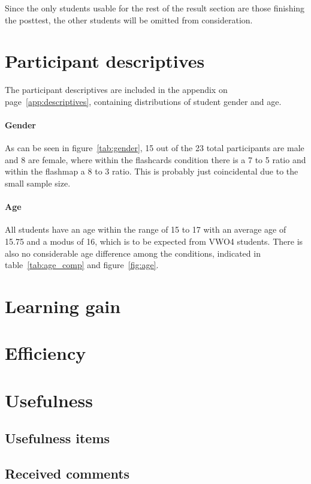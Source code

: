 Since the only students usable for the rest of the result section are those finishing the posttest, the other students will be omitted from consideration.

\section{Participant descriptives}

The participant descriptives are included in the  appendix on page~\ref{app:descriptives}, containing distributions of student gender and age.

\paragraph{Gender} As can be seen in figure~\ref{tab:gender}, 15 out of the 23 total participants are male and 8 are female, where within the flashcards condition there is a 7 to 5 ratio and within the flashmap a 8 to 3 ratio. This is probably just coincidental due to the small sample size.

\paragraph{Age} All students have an age within the range of 15 to 17 with an average age of 15.75 and a modus of 16, which is to be expected from VWO4 students. There is also no considerable age difference among the conditions, indicated in table~\ref{tab:age_comp} and figure~\ref{fig:age}.

\section{Learning gain}

\section{Efficiency}

\section{Usefulness}

\subsection{Usefulness items}

\subsection{Received comments}

